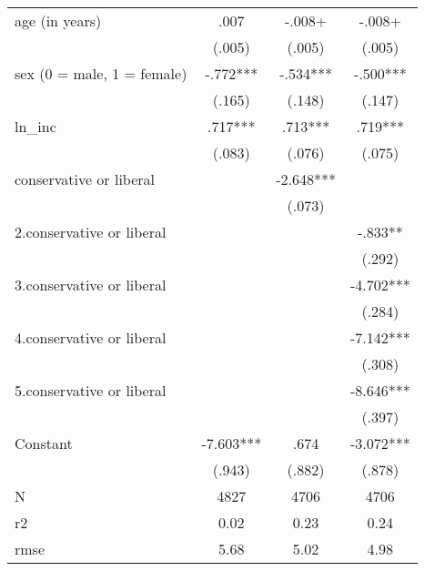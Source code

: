 \documentclass[12pt]{article}
\begin{document}
\begin{enumerate}
\begin{table}[H]
\begin{tabular}{l*{3}{c}}
\hline
\hline
age (in years)                                    &        .007   &       -.008+  &       -.008+  \\
                                                  &      (.005)   &      (.005)   &      (.005)   \\
sex (0 = male, 1 = female)                        &       -.772***&       -.534***&       -.500***\\
                                                  &      (.165)   &      (.148)   &      (.147)   \\
ln\_inc                                            &        .717***&        .713***&        .719***\\
                                                  &      (.083)   &      (.076)   &      (.075)   \\
conservative or liberal                           &               &      -2.648***&               \\
                                                  &               &      (.073)   &               \\
2.conservative or liberal                         &               &               &       -.833** \\
                                                  &               &               &      (.292)   \\
3.conservative or liberal                         &               &               &      -4.702***\\
                                                  &               &               &      (.284)   \\
4.conservative or liberal                         &               &               &      -7.142***\\
                                                  &               &               &      (.308)   \\
5.conservative or liberal                         &               &               &      -8.646***\\
                                                  &               &               &      (.397)   \\
Constant                                          &      -7.603***&        .674   &      -3.072***\\
                                                  &      (.943)   &      (.882)   &      (.878)   \\
\hline
N                                                 &        4827   &        4706   &        4706   \\
r2                                                &           0.02   &           0.23   &           0.24   \\
rmse                                              &           5.68   &    5.02        &          4.98   \\
\hline\hline
\end{tabular}
\end{table}


\end{enumerate}
\end{document}

